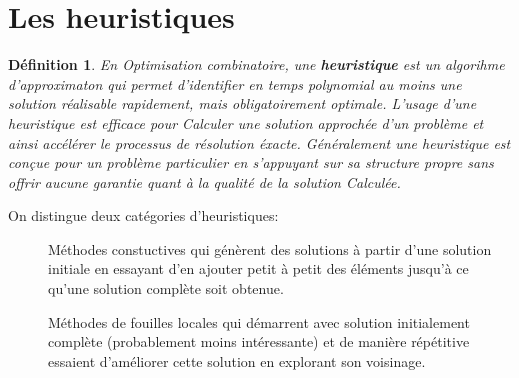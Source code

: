 \documentclass[a4paper,11pt,oneside]{report}
\theoremstyle{plain}
\newtheorem{definition}{D\'efinition}[section]
\newcommand{\0}{/ \! \! \! 0}
\theoremstyle{plain}
\begin{document}
\section{Les heuristiques}
\begin{definition}
En Optimisation combinatoire, une {\bf heuristique} est un algorihme d'approximaton qui permet d'identifier en temps polynomial au moins
une solution r\'ealisable rapidement, mais obligatoirement optimale. L'usage d'une heuristique est efficace pour Calculer une solution approch\'ee
 d'un probl\`eme et ainsi acc\'el\'erer le processus de r\'esolution \'exacte. G\'en\'eralement une heuristique est con\c{c}ue pour un probl\`eme
 particulier en s'appuyant sur sa structure propre sans offrir aucune garantie quant \`a la qualit\'e de la solution Calcul\'ee. 
\end{definition}
 On distingue deux 
 cat\'egories d'heuristiques:
 \begin{description}
  \item[] M\'ethodes constuctives qui g\'en\`erent des solutions \`a partir d'une solution initiale en essayant d'en ajouter petit \`a petit 
  des \'el\'ements jusqu'\`a ce qu'une solution compl\`ete soit obtenue.
  \item[] M\'ethodes de fouilles locales qui d\'emarrent avec solution initialement compl\`ete (probablement moins int\'eressante) et de mani\`ere 
  r\'ep\'etitive essaient d'am\'eliorer cette solution en explorant son voisinage.
 \end{description}
\end{document}
